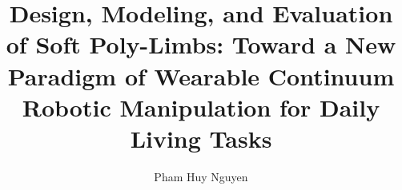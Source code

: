 \title{Design, Modeling, and Evaluation of Soft Poly-Limbs: Toward a New Paradigm of Wearable Continuum Robotic Manipulation for Daily Living Tasks}


\author{Pham Huy Nguyen}








